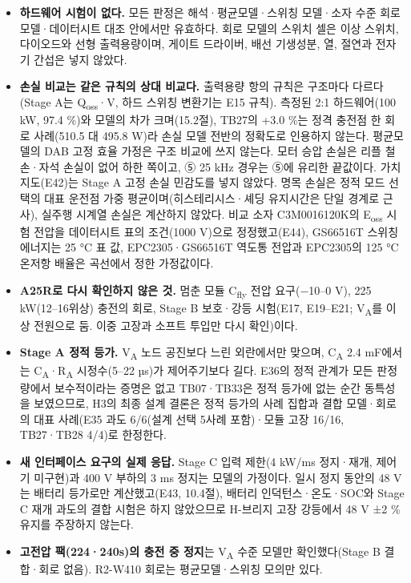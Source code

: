 \begin{itemize}
\item \textbf{하드웨어 시험이 없다.} 모든 판정은 해석·평균모델·스위칭 모델·소자 수준 회로 모델·데이터시트 대조 안에서만 유효하다. 회로 모델의 스위치 셀은 이상 스위치, 다이오드와 선형 출력용량이며, 게이트 드라이버, 배선 기생성분, 열, 절연과 전자기 간섭은 넣지 않았다.
\item \textbf{손실 비교는 같은 규칙의 상대 비교다.} 출력용량 항의 규칙은 구조마다 다르다(Stage A는 Q\textsubscript{oss}·V, 하드 스위칭 변환기는 E15 규칙). 측정된 2:1 하드웨어(100 kW, 97.4 \%)와 모델의 차가 크며(15.2절), TB27의 +3.0 \%는 정격 충전점 한 회로 사례(510.5 대 495.8 W)라 손실 모델 전반의 정확도로 인용하지 않는다. 평균모델의 DAB 고정 효율 가정은 구조 비교에 쓰지 않는다. 모터 승압 손실은 리플 철손·자석 손실이 없어 하한 쪽이고, ⑤ 25 kHz 경우는 ⑤에 유리한 끝값이다. 가치 지도(E42)는 Stage A 고정 손실 민감도를 넣지 않았다. 명목 손실은 정적 모드 선택의 대표 운전점 가중 평균이며(히스테리시스·셰딩 유지시간은 단일 경계로 근사), 실주행 시계열 손실은 계산하지 않았다. 비교 소자 C3M0016120K의 E\textsubscript{oss} 시험 전압을 데이터시트 표의 조건(1000 V)으로 정정했고(E44), GS66516T 스위칭 에너지는 25 °C 표 값, EPC2305·GS66516T 역도통 전압과 EPC2305의 125 °C 온저항 배율은 곡선에서 정한 가정값이다.
\item \textbf{A25R로 다시 확인하지 않은 것.} 멈춘 모듈 C\textsubscript{fly} 전압 요구(−10–0 V), 225 kW(12–16위상) 충전의 회로, Stage B 보호·강등 시험(E17, E19–E21; V\textsubscript{A}를 이상 전원으로 둠. 이중 고장과 소프트 투입만 다시 확인)이다.
\item \textbf{Stage A 정적 등가.} V\textsubscript{A} 노드 공진보다 느린 외란에서만 맞으며, C\textsubscript{A} 2.4 mF에서는 C\textsubscript{A}·R\textsubscript{A} 시정수(5–22 µs)가 제어주기보다 길다. E36의 정적 관계가 모든 판정량에서 보수적이라는 증명은 없고 TB07·TB33은 정적 등가에 없는 순간 동특성을 보였으므로, H3의 최종 설계 결론은 정적 등가의 사례 집합과 결합 모델·회로의 대표 사례(E35 과도 6/6(설계 선택 5사례 포함)·모듈 고장 16/16, TB27·TB28 4/4)로 한정한다.
\item \textbf{새 인터페이스 요구의 실제 응답.} Stage C 입력 제한(4 kW/ms 정지·재개, 제어기 미구현)과 400 V 부하의 3 ms 정지는 모델의 가정이다. 일시 정지 동안의 48 V는 배터리 등가로만 계산했고(E43, 10.4절), 배터리 인덕턴스·온도·SOC와 Stage C 재개 과도의 결합 시험은 하지 않았으므로 H-브리지 고장 강등에서 48 V ±2 \% 유지를 주장하지 않는다.
\item \textbf{고전압 팩(224·240s)의 충전 중 정지}는 V\textsubscript{A} 수준 모델만 확인했다(Stage B 결합·회로 없음). R2-W410 회로는 평균모델·스위칭 모의만 있다.

\end{itemize}
